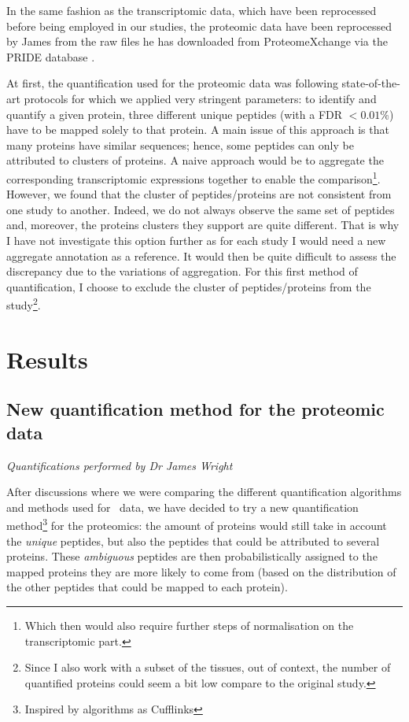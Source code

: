 In the same fashion as the transcriptomic data, which have been reprocessed
before being employed in our studies, the proteomic data have been reprocessed
by James from the raw files he has downloaded from ProteomeXchange
\citep{ProteomeXchange:2014} via the PRIDE database \citep{Pride:2016}.

At first, the quantification used for the proteomic data was following
state-of-the-art protocols for which we applied very stringent parameters:
to identify and quantify a given protein, three different unique peptides
(with a \gls{FDR} $< 0.01 \%$) have to be mapped solely to that protein. A main
issue of this approach is that many proteins have similar sequences; hence, some
peptides can only be attributed to clusters of proteins. A naive approach would
be to aggregate the corresponding transcriptomic expressions together to enable
the comparison\footnote{Which then would also require further steps of
normalisation on the transcriptomic part.}. However, we found that the cluster
of peptides/proteins are not consistent from one study to another. Indeed, we do
not always observe the same set of peptides and, moreover, the proteins clusters
they support are quite different. That is why I have not investigate this option
further as for each study I would need a new aggregate annotation as a reference.
It would then be quite difficult to assess the discrepancy due to the
variations of aggregation. For this first method of quantification, I choose to
exclude the cluster of peptides/proteins from the study\footnote{Since I also work
with a subset of the tissues, out of context, the number of quantified proteins
could seem a bit low compare to the original study.}.


\section{Results}
\label{sec:IntegrationResults}

\subsection{New quantification method for the proteomic data}
\label{subsec:IntegrationNewMethQuant}

\textit{Quantifications performed by Dr James Wright}

After discussions where we were comparing the different quantification algorithms
and methods used for \Rnaseq\ data, we have decided to try a new quantification
method\footnote{Inspired by algorithms as Cufflinks} for the proteomics:
the amount of proteins would still take in account the \emph{unique} peptides,
but also the peptides that could be attributed to several proteins.
These \emph{ambiguous} peptides are then probabilistically assigned to the
mapped proteins they are more likely to come from (based on the distribution of
the other peptides that could be mapped to each protein).

